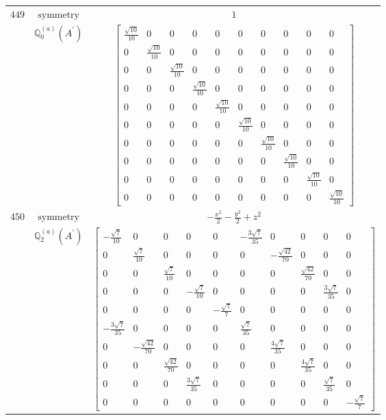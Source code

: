 \documentclass[fleqn,8pt,landscape]{jsarticle}
\begin{document}
\begin{longtable}{ccc}
$ 449 $ & $ \text{symmetry} $ & $ 1 $ \\
$  $ & $ \mathbb{Q}_{0}^{(a)}(A^{\prime}) $ & $ \begin{bmatrix} \frac{\sqrt{10}}{10} & 0 & 0 & 0 & 0 & 0 & 0 & 0 & 0 & 0 \\ 0 & \frac{\sqrt{10}}{10} & 0 & 0 & 0 & 0 & 0 & 0 & 0 & 0 \\ 0 & 0 & \frac{\sqrt{10}}{10} & 0 & 0 & 0 & 0 & 0 & 0 & 0 \\ 0 & 0 & 0 & \frac{\sqrt{10}}{10} & 0 & 0 & 0 & 0 & 0 & 0 \\ 0 & 0 & 0 & 0 & \frac{\sqrt{10}}{10} & 0 & 0 & 0 & 0 & 0 \\ 0 & 0 & 0 & 0 & 0 & \frac{\sqrt{10}}{10} & 0 & 0 & 0 & 0 \\ 0 & 0 & 0 & 0 & 0 & 0 & \frac{\sqrt{10}}{10} & 0 & 0 & 0 \\ 0 & 0 & 0 & 0 & 0 & 0 & 0 & \frac{\sqrt{10}}{10} & 0 & 0 \\ 0 & 0 & 0 & 0 & 0 & 0 & 0 & 0 & \frac{\sqrt{10}}{10} & 0 \\ 0 & 0 & 0 & 0 & 0 & 0 & 0 & 0 & 0 & \frac{\sqrt{10}}{10} \end{bmatrix} $ \\ \hline
$ 450 $ & $ \text{symmetry} $ & $ - \frac{x^{2}}{2} - \frac{y^{2}}{2} + z^{2} $ \\
$  $ & $ \mathbb{Q}_{2}^{(a)}(A^{\prime}) $ & $ \begin{bmatrix} - \frac{\sqrt{7}}{10} & 0 & 0 & 0 & 0 & - \frac{3 \sqrt{7}}{35} & 0 & 0 & 0 & 0 \\ 0 & \frac{\sqrt{7}}{10} & 0 & 0 & 0 & 0 & - \frac{\sqrt{42}}{70} & 0 & 0 & 0 \\ 0 & 0 & \frac{\sqrt{7}}{10} & 0 & 0 & 0 & 0 & \frac{\sqrt{42}}{70} & 0 & 0 \\ 0 & 0 & 0 & - \frac{\sqrt{7}}{10} & 0 & 0 & 0 & 0 & \frac{3 \sqrt{7}}{35} & 0 \\ 0 & 0 & 0 & 0 & - \frac{\sqrt{7}}{7} & 0 & 0 & 0 & 0 & 0 \\ - \frac{3 \sqrt{7}}{35} & 0 & 0 & 0 & 0 & \frac{\sqrt{7}}{35} & 0 & 0 & 0 & 0 \\ 0 & - \frac{\sqrt{42}}{70} & 0 & 0 & 0 & 0 & \frac{4 \sqrt{7}}{35} & 0 & 0 & 0 \\ 0 & 0 & \frac{\sqrt{42}}{70} & 0 & 0 & 0 & 0 & \frac{4 \sqrt{7}}{35} & 0 & 0 \\ 0 & 0 & 0 & \frac{3 \sqrt{7}}{35} & 0 & 0 & 0 & 0 & \frac{\sqrt{7}}{35} & 0 \\ 0 & 0 & 0 & 0 & 0 & 0 & 0 & 0 & 0 & - \frac{\sqrt{7}}{7} \end{bmatrix} $ \\ \hline

\end{longtable}
\end{document}
